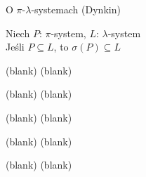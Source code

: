 \documentclass[avery5371,grid,frame]{flashcards}
\begin{document}
\begin{flashcard}[Twierdzenie]{O $\pi$-$\lambda$-systemach (Dynkin)}

\smallskip
Niech $\mathit{P}$: $\pi$-system, $\mathit{L}$: $\lambda$-system \\
Jeśli $\mathit{P} \subseteq \mathit{L}$, to $\sigma(\mathit{P}) \subseteq \mathit{L}$
\end{flashcard}

\begin{flashcard}[Twierdzenie]{(blank)}
(blank)
\end{flashcard}
\begin{flashcard}[Twierdzenie]{(blank)}
(blank)
\end{flashcard}
\begin{flashcard}[Twierdzenie]{(blank)}
(blank)
\end{flashcard}
\begin{flashcard}[Twierdzenie]{(blank)}
(blank)
\end{flashcard}
\begin{flashcard}[Twierdzenie]{(blank)}
(blank)
\end{flashcard}
\end{document}
